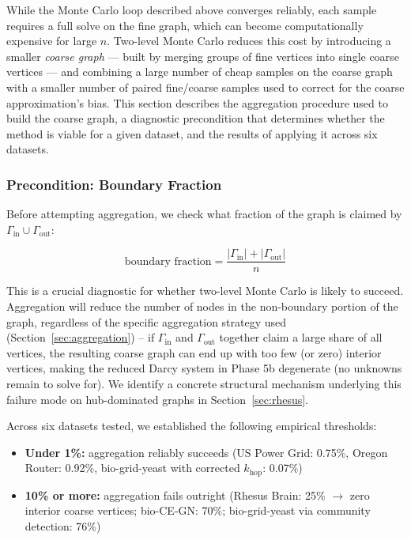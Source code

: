 \documentclass[a4paper,12pt]{amsart}
\numberwithin{equation}{section}
\begin{document}
While the Monte Carlo loop described above converges reliably, each 
sample requires a full solve on the fine graph, which can become 
computationally expensive for large $n$. Two-level Monte Carlo reduces 
this cost by introducing a smaller \emph{coarse graph} — built by 
merging groups of fine vertices into single coarse vertices — and 
combining a large number of cheap samples on the coarse graph with a 
smaller number of paired fine/coarse samples used to correct for the 
coarse approximation's bias. This section describes the aggregation 
procedure used to build the coarse graph, a diagnostic precondition 
that determines whether the method is viable for a given dataset, and 
the results of applying it across six datasets.

\subsubsection{Precondition: Boundary Fraction}
\label{sec:boundary_fraction}

Before attempting aggregation, we check what fraction of the graph is 
claimed by $\Gamma_{\text{in}} \cup \Gamma_{\text{out}}$:

\begin{equation}
\text{boundary fraction} = \frac{|\Gamma_{\text{in}}| + |\Gamma_{\text{out}}|}{n}
\end{equation}

This is a crucial diagnostic for whether two-level 
Monte Carlo is likely to succeed.  Aggregation will reduce the number of nodes in the 
non-boundary portion of the graph, regardless of the specific 
aggregation strategy used (Section~\ref{sec:aggregation}) -- if $\Gamma_{\text{in}}$ and 
$\Gamma_{\text{out}}$ together claim a large share of all vertices, 
the resulting coarse graph can end up with too few (or zero) interior 
vertices, making the reduced Darcy system in Phase 5b degenerate (no 
unknowns remain to solve for). We identify a 
concrete structural mechanism underlying this failure mode on 
hub-dominated graphs in Section~\ref{sec:rhesus}.

Across six datasets tested, we established the following empirical 
thresholds:

\begin{itemize}[noitemsep, topsep=4pt, leftmargin=3em]
    \item \textbf{Under 1\%:} aggregation reliably succeeds (US Power 
    Grid: 0.75\%, Oregon Router: 0.92\%, bio-grid-yeast with corrected 
    $k_{\text{hop}}$: 0.07\%)
    \item \textbf{10\% or more:} aggregation fails outright (Rhesus 
    Brain: 25\% $\to$ zero interior coarse vertices; bio-CE-GN: 70\%; 
    bio-grid-yeast via community detection: 76\%)
\end{itemize}
\end{document}
